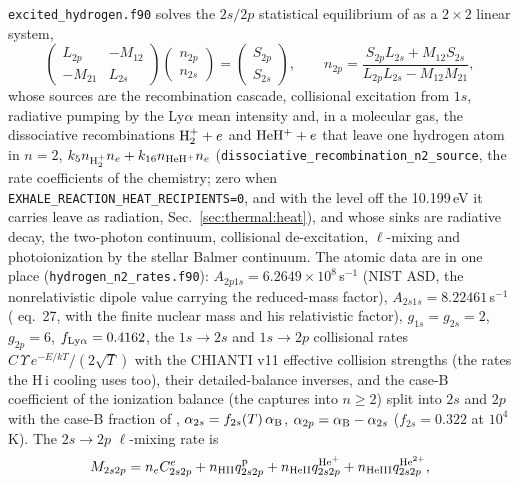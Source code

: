 \texttt{excited\_hydrogen.f90} solves the $2s/2p$ statistical equilibrium of
\citet[their eqs.~(12)--(13)]{Christie2013} as a
$2\times2$ linear system,
\begin{equation}
\begin{pmatrix} L_{2p} & -M_{12}\\ -M_{21} & L_{2s}\end{pmatrix}
\begin{pmatrix} n_{2p}\\ n_{2s}\end{pmatrix}
=\begin{pmatrix} S_{2p}\\ S_{2s}\end{pmatrix},
\qquad
n_{2p} = \frac{S_{2p}L_{2s}+M_{12}S_{2s}}{L_{2p}L_{2s}-M_{12}M_{21}},
\label{eq:ion:n2pop}
\end{equation}
whose sources are the recombination cascade, collisional excitation from
$1s$, radiative pumping by the Ly$\alpha$ mean intensity and, in a molecular
gas, the dissociative recombinations ${\rm H_2^+}+e$ and ${\rm HeH^+}+e$ that
leave one hydrogen atom in $n=2$,
$k_5n_{\rm H_2^+}n_e+k_{16}n_{\rm HeH^+}n_e$
(\texttt{dissociative\_recombination\_n2\_source}, the rate coefficients of
the chemistry; zero when \texttt{EXHALE\_REACTION\_HEAT\_RECIPIENTS=0}, and
with the level off the 10.199\,eV it carries leave as radiation,
Sec.~\ref{sec:thermal:heat}), and whose
sinks are radiative decay, the two-photon continuum, collisional
de-excitation, $\ell$-mixing and photoionization by the stellar Balmer
continuum. The atomic data are in one place
(\texttt{hydrogen\_n2\_rates.f90}): $A_{2p1s}=6.2649\times10^{8}$\,s$^{-1}$
(NIST ASD, the nonrelativistic dipole value carrying the reduced-mass
factor), $A_{2s1s}=8.22461$\,s$^{-1}$ (\citealt{Drake1986} eq.~27, with the
finite nuclear mass and his relativistic factor), $g_{1s}=g_{2s}=2$, $g_{2p}=6$,
$f_{\rm Ly\alpha}=0.4162$, the $1s\to2s$ and $1s\to2p$ collisional rates
$C\,\Upsilon\,e^{-E/kT}/(2\sqrt{T})$ with the CHIANTI v11
effective collision strengths (the rates the H\,{\sc i} cooling uses too),
their detailed-balance inverses, and the case-B coefficient of the
ionization balance (the captures into $n\ge2$) split into $2s$ and $2p$ with
the case-B fraction of \citet[Table~I]{Pengelly1964}, $\alpha_{2s} =
f_{2s}(T)\,\alpha_{\rm B}$, $\alpha_{2p} = \alpha_{\rm B}-\alpha_{2s}$
($f_{2s} = 0.322$ at $10^4$\,K). The $2s\to2p$ $\ell$-mixing rate is
\begin{equation}
M_{2s2p} = n_e C^{e}_{2s2p} + n_{\rm HII}q^{\rm p}_{2s2p}
   + n_{\rm HeII}q^{\rm He^+}_{2s2p} + n_{\rm HeIII}q^{\rm He^{2+}}_{2s2p},
\label{eq:ion:lmix}
\end{equation}
